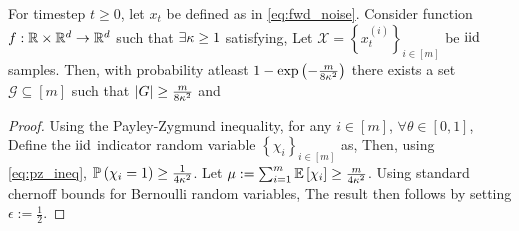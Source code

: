 \begin{lemma}\label{lemma:conv_function_l2_error}
    For timestep $t \geq 0$, let $x_t$ be defined as in \eqref{eq:fwd_noise}. Consider function $f : \mathbb{R} \times \mathbb{R}^{d} \rightarrow \mathbb{R}^{d}$ such that $\exists \kappa \geq 1$ satisfying,
    Let $\mathcal{X} = \left\{x_{t}^{(i)}\right\}_{i \in [m]}$ be $\textup{iid}$ samples. Then, with probability atleast $1-\exp\left(-\frac{m}{8\kappa^{2}}\right)$ there exists a set $\mathcal{G} \subseteq [m]$ such that $|G| \geq \frac{m}{8\kappa^{2}}$ and 
\end{lemma}
\begin{proof}
    Using the Payley-Zygmund inequality, for any $i \in [m]$, $\forall \theta \in [0,1]$,
    Define the $\textup{iid}$ indicator random variable $\left\{\chi_{i}\right\}_{i \in [m]}$ as, 
    Then, using \eqref{eq:pz_ineq}, $\mathbb{P}\left(\chi_{i} = 1\right) \geq \frac{1}{4\kappa^{2}}$. Let $\mu := \sum_{i=1}^{m}\mathbb{E}\left[\chi_{i}\right] \geq \frac{m}{4\kappa^{2}}$. Using standard chernoff bounds for Bernoulli random variables, 
    The result then follows by setting $\epsilon := \frac{1}{2}$.
\end{proof}

